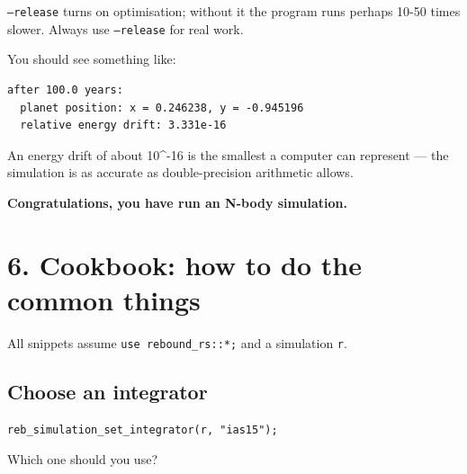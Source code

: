 \documentclass[11pt]{article}
\begin{document}
\texttt{--release} turns on optimisation; without it the program runs perhaps 10-50 times slower. Always use \texttt{--release} for real work.

You should see something like:

\begin{lstlisting}
after 100.0 years:
  planet position: x = 0.246238, y = -0.945196
  relative energy drift: 3.331e-16
\end{lstlisting}

An energy drift of about 10\textasciicircum{}-16 is the smallest a computer can represent --- the simulation is as accurate as double-precision arithmetic allows.

\textbf{Congratulations, you have run an N-body simulation.}

\section{6. Cookbook: how to do the common things}

All snippets assume \texttt{use rebound\_rs::*;} and a simulation \texttt{r}.

\subsection{Choose an integrator}

\begin{lstlisting}
reb_simulation_set_integrator(r, "ias15");
\end{lstlisting}

Which one should you use?
\end{document}
